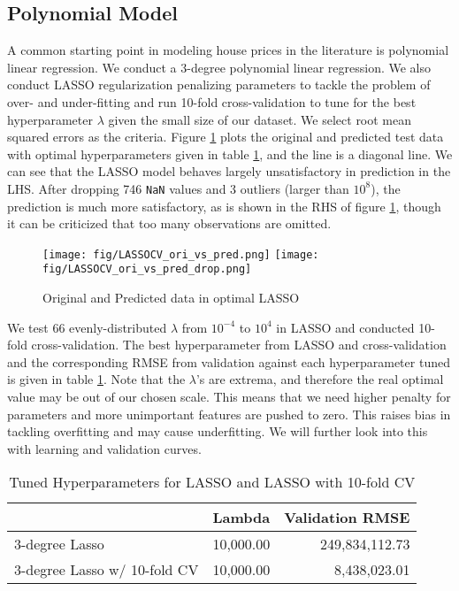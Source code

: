 \documentclass[12pt]{article} %
\begin{document}
{        \subsection{Polynomial Model}
        A common starting point in modeling house prices in the literature is polynomial linear regression. We conduct a 3-degree polynomial linear regression. We also conduct LASSO regularization penalizing parameters to tackle the problem of over- and under-fitting and run 10-fold cross-validation to tune for the best hyperparameter $\lambda$ given the small size of our dataset. We select root mean squared errors as the criteria. Figure \ref{fig:LASSOCVoripredtwo} plots the original and predicted test data with optimal hyperparameters given in table \ref{table:hyperparaLASSO}, and the line is a diagonal line. We can see that the LASSO model behaves largely unsatisfactory in prediction in the LHS. After dropping 746 \texttt{NaN} values and 3 outliers (larger than $10^8$), the prediction is much more satisfactory, as is shown in the RHS of figure \ref{fig:LASSOCVoripredtwo}, though it can be criticized that too many observations are omitted.

            \begin{figure}
                \centering
                \texttt{[image: fig/LASSOCV\_ori\_vs\_pred.png]}\hfill
                \texttt{[image: fig/LASSOCV\_ori\_vs\_pred\_drop.png]}
                \caption{Original and Predicted data in optimal LASSO}
                \label{fig:LASSOCVoripredtwo}
            \end{figure}

		
		We test 66 evenly-distributed $\lambda$ from $10^{-4}$ to $10^4$ in LASSO and conducted 10-fold cross-validation. The best hyperparameter from LASSO and cross-validation and the corresponding RMSE from validation against each hyperparameter tuned is given in table \ref{table:hyperparaLASSO}. Note that the $\lambda$'s are extrema, and therefore the real optimal value may be out of our chosen scale. This means that we need higher penalty for parameters and more unimportant features are pushed to zero. This raises bias in tackling overfitting and may cause underfitting. We will further look into this with learning and validation curves.
  
            \begin{table}[]
            \begin{tabular}{lrr}
                             & \multicolumn{1}{l}{\textbf{Lambda}} & \multicolumn{1}{l}{\textbf{Validation RMSE}} \\ \hline
                3-degree Lasso               & 10,000.00                           & 249,834,112.73                               \\
                3-degree Lasso w/ 10-fold CV & 10,000.00                           & 8,438,023.01                                 \\ \hline
                \end{tabular}
            \caption{Tuned Hyperparameters for LASSO and LASSO with 10-fold CV}
            \label{table:hyperparaLASSO}
            \end{table}
            
}
\end{document}
